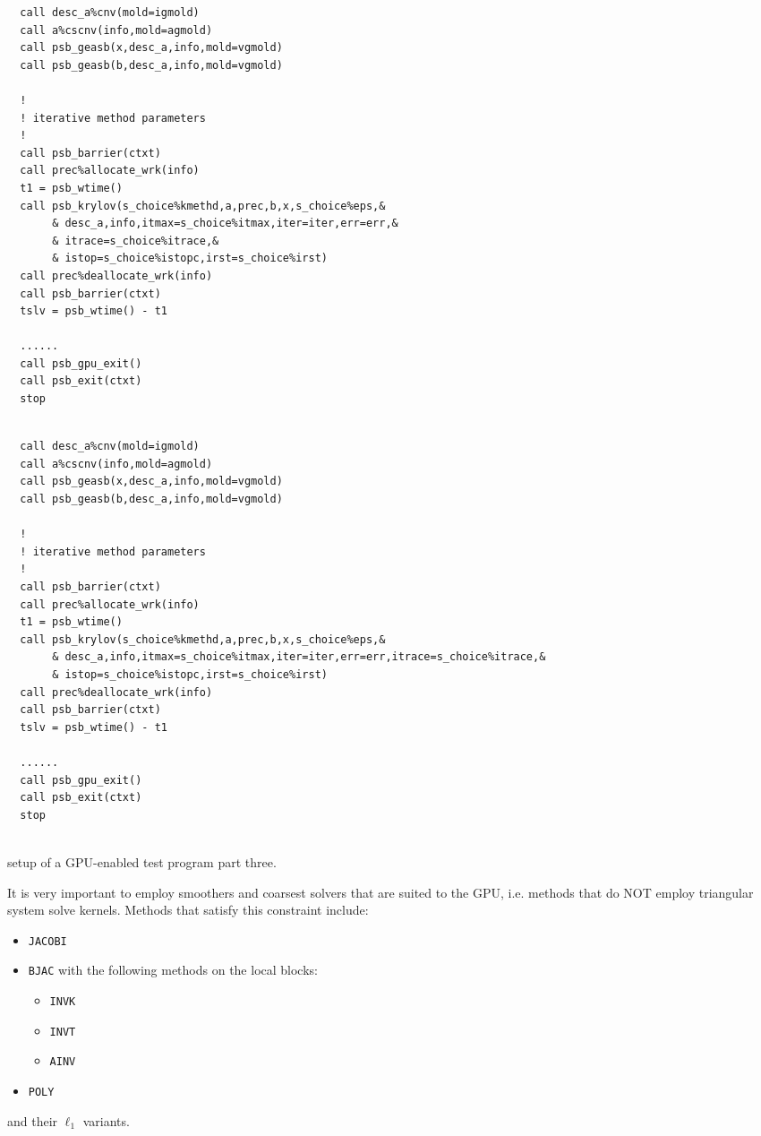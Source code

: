 \begin{listing}[h!]
\ifpdf
\begin{verbatim}
  call desc_a%cnv(mold=igmold)
  call a%cscnv(info,mold=agmold)
  call psb_geasb(x,desc_a,info,mold=vgmold)
  call psb_geasb(b,desc_a,info,mold=vgmold)

  !
  ! iterative method parameters
  !
  call psb_barrier(ctxt)
  call prec%allocate_wrk(info)
  t1 = psb_wtime()
  call psb_krylov(s_choice%kmethd,a,prec,b,x,s_choice%eps,&
       & desc_a,info,itmax=s_choice%itmax,iter=iter,err=err,&
       & itrace=s_choice%itrace,&
       & istop=s_choice%istopc,irst=s_choice%irst)
  call prec%deallocate_wrk(info)
  call psb_barrier(ctxt)
  tslv = psb_wtime() - t1

  ......
  call psb_gpu_exit()
  call psb_exit(ctxt)
  stop
  

\end{verbatim}
\else
\begin{center}
\begin{minipage}{.90\textwidth}
{\small
\begin{verbatim}
  call desc_a%cnv(mold=igmold)
  call a%cscnv(info,mold=agmold)
  call psb_geasb(x,desc_a,info,mold=vgmold)
  call psb_geasb(b,desc_a,info,mold=vgmold)

  !
  ! iterative method parameters
  !
  call psb_barrier(ctxt)
  call prec%allocate_wrk(info)
  t1 = psb_wtime()
  call psb_krylov(s_choice%kmethd,a,prec,b,x,s_choice%eps,&
       & desc_a,info,itmax=s_choice%itmax,iter=iter,err=err,itrace=s_choice%itrace,&
       & istop=s_choice%istopc,irst=s_choice%irst)
  call prec%deallocate_wrk(info)
  call psb_barrier(ctxt)
  tslv = psb_wtime() - t1

  ......
  call psb_gpu_exit()
  call psb_exit(ctxt)
  stop
  
 \end{verbatim}
}
\end{minipage}
\end{center}
\fi
\caption{setup of a GPU-enabled test program part three.\label{fig:gpu-ex3}}
\end{listing}

It is very important to employ smoothers and coarsest solvers that are suited
to the GPU, i.e.  methods that do NOT employ triangular
system solve kernels. Methods that satisfy this constraint include:
\begin{itemize}
\item \verb|JACOBI|
\item \verb|BJAC| with the following methods on the local blocks:
\begin{itemize}
\item \verb|INVK|
\item \verb|INVT|
\item \verb|AINV|
\end{itemize}
\item \verb|POLY|
\end{itemize}
and their $\ell_1$ variants. 

